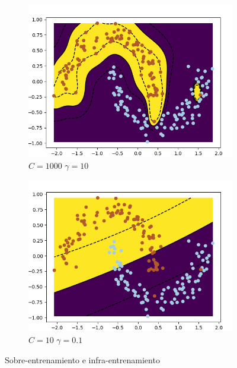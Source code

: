\begin{figure}[H]
	\begin{subfigure}{0.48\textwidth}
    	\includegraphics[width=\linewidth, height=1\linewidth]{img/dataset3_3}	
    	\caption{$C=1000$ $\gamma=10$}
	\end{subfigure}
	\begin{subfigure}{0.48\textwidth}
    	\includegraphics[width=\linewidth, height=1\linewidth]{img/dataset3_4}	
    	\caption{$C=10$ $\gamma=0.1$}
	\end{subfigure}
	\caption{Sobre-entrenamiento e infra-entrenamiento}
	\label{3_sobreentrenamiento_infraentrenamiento}
\end{figure}

